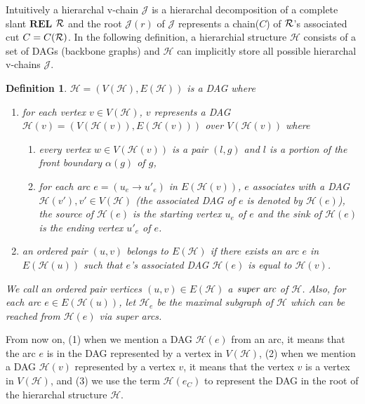 \documentclass[11pt]{article}
\newcommand{\R}{{\cal R}}
\newcommand{\HH}{\mathcal{H}}
\newcommand{\JJ}{\mathcal{J}}
\newcommand{\REL}{\mathbf{REL}}
\newtheorem{definition}[figure]{Definition}
\begin{document}
Intuitively a hierarchal v-chain $\JJ$ is a hierarchal decomposition of
a complete slant $\REL$ $\R$ and
the root $\JJ(r)$ of $\JJ$ represents a chain($C$) of $\R$'s associated cut $C=C(\R)$.
In the following definition,
a hierarchial structure $\HH$ consists of a set of DAGs (backbone graphs)
and $\HH$ can implicitly store all possible hierarchal v-chains $\JJ$.


\begin{definition}
$\HH=(V(\HH), E(\HH))$ is a DAG where

\begin{enumerate}

\item for each vertex $v\in V(\HH)$, $v$ represents a DAG
$\HH(v)=(V(\HH(v)), E(\HH(v)))$ over $V(\HH(v))$ where
\begin{enumerate}
\item every vertex $w \in V(\HH(v))$
is a pair $(l, g)$ and $l$ is a portion
of the front boundary $\alpha(g)$ of $g$,

\item for each arc $e=(u_e\rightarrow u'_e)$ in $E(\HH(v))$, $e$ associates with a DAG $\HH(v'), v'\in V(\HH)$
(the associated DAG of $e$ is denoted by $\HH(e)$),
the source of $\HH(e)$ is the starting vertex $u_e$ of $e$ and
the sink of $\HH(e)$ is the ending vertex $u'_e$ of $e$.
\end{enumerate}

\item an ordered pair $(u, v)$ belongs to $E(\HH)$ if there exists an arc $e$ in $E(\HH(u))$ such that
$e$'s associated DAG $\HH(e)$ is equal to $\HH(v)$.
\end{enumerate}
We call an ordered pair vertices $(u, v) \in E(\HH)$ a $\emph{super arc}$ of $\HH$.
Also, for each arc $e\in E(\HH(u))$,
let $\HH_e$ be the maximal subgraph of $\HH$ which
can be reached from $\HH(e)$ via super arcs.
\end{definition}






From now on,
(1) when we mention a DAG $\HH(e)$ from an arc, it means that
the arc $e$ is in the DAG represented by a vertex in $V(\HH)$,
(2) when we mention a DAG $\HH(v)$ represented by a vertex $v$,
it means that the vertex $v$ is a vertex in $V(\HH)$, and
(3) we use the term $\HH(e_C)$ to represent the DAG
in the root of the hierarchal structure $\HH$.
\end{document}
